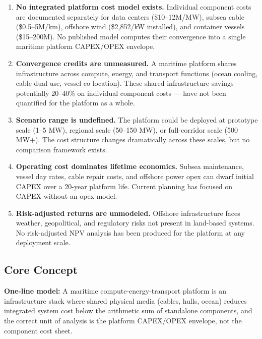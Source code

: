 \documentclass[11pt,letterpaper]{article}
\begin{document}
\begin{enumerate}
\item \textbf{No integrated platform cost model exists.} Individual component costs are documented
  separately for data centers (\$10--12M/MW), subsea cable (\$0.5--5M/km), offshore wind (\$2,852/kW
  installed), and container vessels (\$15--200M). No published model computes their convergence
  into a single maritime platform CAPEX/OPEX envelope.

\item \textbf{Convergence credits are unmeasured.} A maritime platform shares infrastructure across
  compute, energy, and transport functions (ocean cooling, cable dual-use, vessel co-location).
  These shared-infrastructure savings --- potentially 20--40\% on individual component costs ---
  have not been quantified for the platform as a whole.

\item \textbf{Scenario range is undefined.} The platform could be deployed at prototype scale (1--5 MW),
  regional scale (50--150 MW), or full-corridor scale (500 MW+). The cost structure changes
  dramatically across these scales, but no comparison framework exists.

\item \textbf{Operating cost dominates lifetime economics.} Subsea maintenance, vessel day rates,
  cable repair costs, and offshore power opex can dwarf initial CAPEX over a 20-year platform
  life. Current planning has focused on CAPEX without an opex model.

\item \textbf{Risk-adjusted returns are unmodeled.} Offshore infrastructure faces weather, geopolitical,
  and regulatory risks not present in land-based systems. No risk-adjusted NPV analysis has
  been produced for the platform at any deployment scale.
\end{enumerate}

\subsection{Core Concept}

\textbf{One-line model:} A maritime compute-energy-transport platform is an infrastructure stack
where shared physical media (cables, hulls, ocean) reduces integrated system cost below the
arithmetic sum of standalone components, and the correct unit of analysis is the platform
CAPEX/OPEX envelope, not the component cost sheet.
\end{document}

